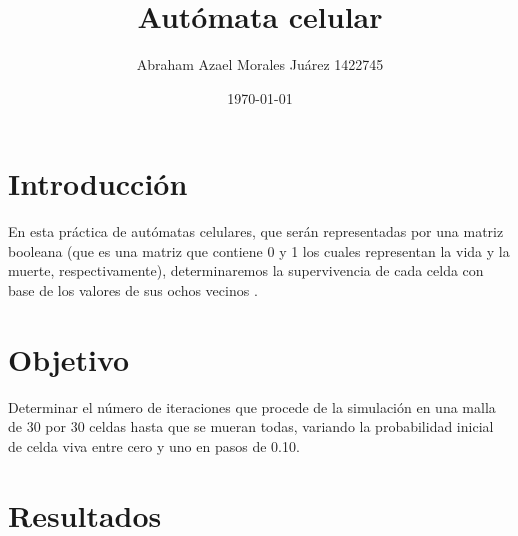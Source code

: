 \documentclass{article}
\author{Abraham Azael Morales Juárez 1422745}
\title{Autómata celular}
\date{\today}
\begin{document}
\maketitle

\section{Introducción}
En esta práctica de autómatas celulares, que serán representadas por una matriz booleana (que es una matriz que contiene 0 y 1 los cuales representan la vida y la muerte, respectivamente), determinaremos la supervivencia de cada celda con base de los valores de sus ochos vecinos \cite{Practica}.

\section{Objetivo}
Determinar el número de iteraciones que procede de la simulación en una malla de 30 por 30 celdas hasta que se mueran todas, variando la probabilidad inicial de celda viva entre cero y uno en pasos de 0.10.
\section{Resultados}

 

\end{document}
